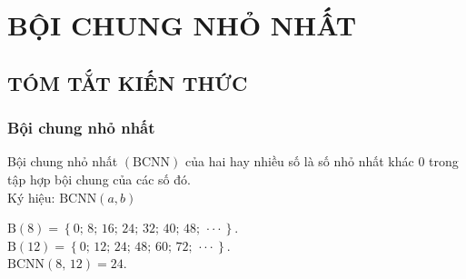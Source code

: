 \section{BỘI CHUNG NHỎ NHẤT}
\subsection{TÓM TẮT KIẾN THỨC}
\begin{tomtat}
	\subsubsection{Bội chung nhỏ nhất}
Bội chung nhỏ nhất $\left( \text{BCNN} \right)$ của hai hay nhiều số là số nhỏ nhất khác $0$ trong tập hợp bội chung của các số đó.\\
Ký hiệu: $\text{BCNN}\left( {a,b} \right)$\\
\begin{vd}
$\text{B}\left( {8} \right) = \left\{ {0;\,8;\,16;\,24;\,32;\,40;\,48;\, \cdot \cdot \cdot} \right\}$.\\
$\text{B}\left( {12} \right) = \left\{ {0;\,12;\,24;\,48;\,60;\,72;\, \cdot \cdot \cdot} \right\}$.\\
$\text{BCNN}\left( {8,\,12} \right) = 24$.
\end{vd}

\end{tomtat}
